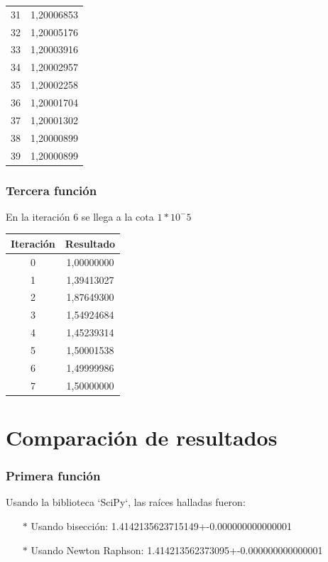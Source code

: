 \documentclass[titlepage,a4paper]{article}
\begin{document}
\begin{center}
\begin{tabular}{| c | c |}
        31    & 1,20006853 \\
        32    & 1,20005176 \\
        33    & 1,20003916 \\
        34    & 1,20002957 \\
        35    & 1,20002258 \\
        36    & 1,20001704 \\
        37    & 1,20001302 \\
        38    & 1,20000899 \\
        39    & 1,20000899 \\
    \hline
    \end{tabular}
\end{center}

\subsubsection{Tercera función}\label{sec:sec3}
En la iteración 6 se llega a la cota $1*10^-5$
\begin{center}
\begin{tabular}{| c | c |}
    \hline
     Iteración & Resultado \\ \hline
        0     & 1,00000000 \\
        1     & 1,39413027 \\
        2     & 1,87649300 \\
        3     & 1,54924684 \\
        4     & 1,45239314 \\
        5     & 1,50001538 \\
        6     & 1,49999986 \\
        7     & 1,50000000 \\
    \hline
    \end{tabular}
\end{center}

\section{Comparación de resultados}\label{sec:comparacion_resultados}
\subsubsection{Primera función}\label{sec:CR1}

Usando la biblioteca `SciPy`, las raíces halladas fueron:
\begin{itemize}
    \item[$*$]Usando bisección:  1.4142135623715149+-0.000000000000001
    \item[$*$]Usando Newton Raphson:  1.414213562373095+-0.000000000000001
\end{itemize}
\end{document}
